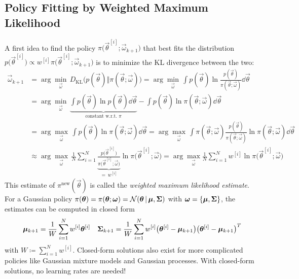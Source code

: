 		\subsection{Policy Fitting by Weighted Maximum Likelihood}
			A first idea to find the policy \( \pi\big(\vec{\theta}^{[i]}; \vec{\omega}_{k + 1}\big) \) that best fits the distribution \( p\big(\vec{\theta}^{[i]}\big) \propto w^{[i]} \pi\big(\vec{\theta}^{[i]}; \vec{\omega}_{k + 1}\big) \) is to minimize the KL divergence between the two:
			\begin{align}
				\vec{\omega}_{k + 1}
					&= \arg\min_{\vec{\omega}}\, D_\mathrm{KL}\big( p(\vec{\theta}) \Vert \pi(\vec{\theta}; \vec{\omega}) \big)
					 = \arg\min_{\vec{\omega}}\, \int\! p(\vec{\theta}) \ln \frac{p(\vec{\theta})}{\pi(\vec{\theta}; \vec{\omega})} \dd{\vec{\theta}}  \nonumber \\
					&= \arg\min_{\vec{\omega}}\, \underbrace{\int\! p(\vec{\theta}) \ln p(\vec{\theta}) \dd{\vec{\theta}}}_\text{constant w.r.t. \(\pi\)} - \int\! p(\vec{\theta}) \ln \pi(\vec{\theta}; \vec{\omega}) \dd{\vec{\theta}}  \nonumber \\
					&= \arg\max_{\vec{\omega}}\, \int\! p(\vec{\theta}) \ln \pi(\vec{\theta}; \vec{\omega}) \dd{\vec{\theta}}
					 = \arg\max_{\vec{\omega}}\, \int\! \pi(\vec{\theta}; \vec{\omega}) \frac{p(\vec{\theta})}{\pi(\vec{\theta}; \vec{\omega})} \ln \pi(\vec{\theta}; \vec{\omega}) \dd{\vec{\theta}}  \nonumber \\
					&\approx \arg\max_{\vec{\omega}}\, \frac{1}{N} \sum_{i = 1}^{N} \underbrace{\frac{p\big(\vec{\theta}^{[i]}\big)}{\pi\big(\vec{\theta}^{[i]}; \vec{\omega}\big)}}_{=\, w^{[i]}} \ln \pi\big(\vec{\theta}^{[i]}; \vec{\omega}\big)
					 = \arg\max_{\vec{\omega}} \frac{1}{N} \sum_{i = 1}^{N} w^{[i]} \ln \pi\big(\vec{\theta}^{[i]}; \vec{\omega}\big)  \label{eq:weightedMaxLikelihoodObjective}
			\end{align}
			This estimate of \( \pi^\mathrm{new}(\vec{\theta}) \) is called the \emph{weighted maximum likelihood estimate}. For a Gaussian policy \( \pi(\bm{\theta}) = \pi(\bm{\theta}; \bm{\omega}) = \mathcal{N}(\bm{\theta} \,\vert\, \bm{\mu}, \bm{\mathrm{\Sigma}}) \) with \( \bm{\omega} = \{ \bm{\mu}, \bm{\mathrm{\Sigma}} \} \), the estimates can be computed in closed form
			\begin{align*}
				\bm{\mu}_{k + 1} = \frac{1}{W} \sum_{i = 1}^{N} w^{[i]} \bm{\theta}^{[i]}
				&&
				\bm{\mathrm{\Sigma}}_{k + 1} = \frac{1}{W} \sum_{i = 1}^{N} w^{[i]} \big( \bm{\theta}^{[i]} - \bm{\mu}_{k + 1} \big) \big( \bm{\theta}^{[i]} - \bm{\mu}_{k + 1} \big)^T
			\end{align*}
			with \( W \coloneqq \sum_{i = 1}^{N} w^{[i]} \). Closed-form solutions also exist for more complicated policies like Gaussian mixture models and Gaussian processes. With closed-form solutions, no learning rates are needed!

